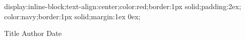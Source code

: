 {display:inline-block;text-align:center;color:red;border:1px solid;padding:2ex;}
{color:navy;border:1px solid;margin:1ex 0ex;}
\newenvironment{external}
{}
{\@close{div}}

\begin{center}
\begin{external}
Title
Author
Date
\end{external}
\end{center}

